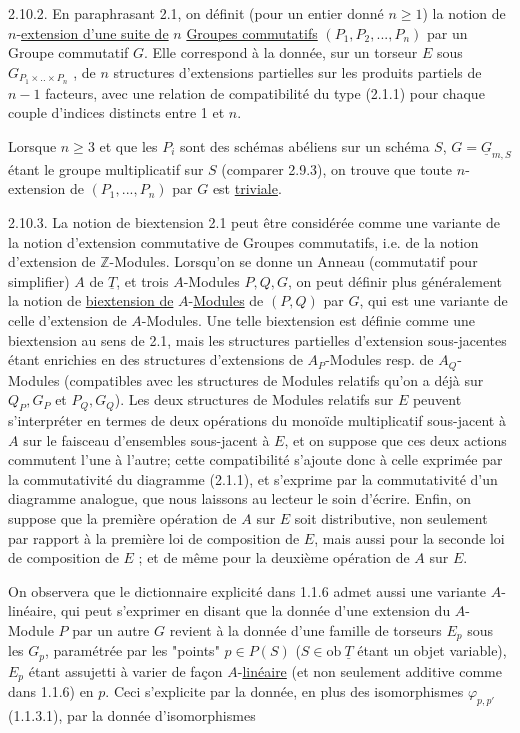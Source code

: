 2.10.2.  En paraphrasant 2.1, on définit (pour un entier donné $n \geq 1$) la notion de $n$-\underline{extension d'une suite de} $n$ \underline{Groupes commutatifs} $(P_1,P_2,...,P_n)$ par un Groupe commutatif $G$. Elle correspond à la donnée, sur un torseur $E$ sous $G_{P_1\times..\times P_n}$ , de $n$ structures d'extensions partielles sur les produits partiels de $n-1$ facteurs, avec une relation de compatibilité du type (2.1.1) pour chaque couple d'indices distincts entre 1 et $n$.

          Lorsque $n \geq 3$ et que les $P_i$ sont des schémas abéliens sur un schéma $S$, $G=\underline{G}_{m,S}$ étant le groupe multiplicatif sur $S$ (comparer 2.9.3), on trouve que toute $n$-extension de $(P_1,...,P_n)$ par $G$ est \underline{triviale}.

2.10.3.  La notion de biextension 2.1 peut être considérée comme une variante de la notion d'extension commutative de Groupes commutatifs, i.e. de la notion d'extension de $\mathbb{Z}$-Modules. Lorsqu'on se donne un Anneau (commutatif pour simplifier) $A$ de $\underline{T}$, et trois $A$-Modules $P,Q,G$, on peut
définir plus généralement la notion de \underline{biextension de} $A$-\underline{Modules} de $(P,Q)$ par $G$, qui est une variante de celle d'extension de $A$-Modules. Une telle biextension est définie comme une biextension au sens de 2.1, mais les structures partielles d'extension sous-jacentes étant enrichies en des structures d'extensions de $A_P$-Modules resp. de $A_Q$-Modules (compatibles avec les structures de Modules relatifs qu'on a déjà sur $Q_P,G_P$ et $P_Q,G_Q$). Les deux structures de Modules relatifs sur $E$ peuvent s'interpréter en termes de deux opérations du monoïde multiplicatif sous-jacent à $A$ sur le faisceau d'ensembles sous-jacent à $E$, et on suppose que ces deux actions commutent l'une à l'autre; cette compatibilité s'ajoute donc à celle exprimée par la commutativité du diagramme (2.1.1), et s'exprime par la commutativité d'un diagramme analogue, que nous laissons au lecteur le soin d'écrire. Enfin, on suppose que la première opération de $A$ sur $E$ soit distributive, non seulement par rapport à la première loi de composition de $E$, mais aussi pour la seconde loi de composition de $E$ ; et de même pour la deuxième opération de $A$ sur $E$.

          On observera que le dictionnaire explicité dans 1.1.6 admet aussi une variante $A$-linéaire, qui peut s'exprimer en disant que la donnée d'une extension du $A$-Module $P$ par un autre $G$ revient à la donnée d'une famille de torseurs $E_p$ sous les $G_p$, paramétrée par les "points" $p \in P(S)$ ($S \in \mathrm{ob}\ \underline{T}$ étant un objet variable), $E_p$ étant assujetti à varier de façon $A$-\underline{linéaire} (et non seulement additive comme dans 1.1.6) en $p$. Ceci s'explicite par la donnée, en plus des isomorphismes $\varphi_{p,p'}$ (1.1.3.1), par la donnée d'isomorphismes

